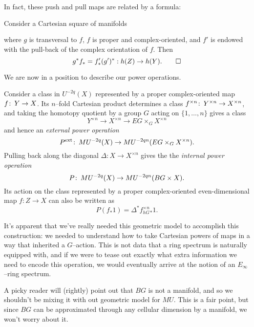 In fact, these push and pull maps are related by a formula:
\begin{lemma}\label{PushPullFormulaForMU}
Consider a Cartesian square of manifolds
\begin{center}
\end{center}
where $g$ is transversal to $f$, $f$ is proper and complex-oriented, and $f'$ is endowed with the pull-back of the complex orientation of $f$. Then \[g^* f_* = f'_* (g')^*: h(Z) \to h(Y). \qed\]
\end{lemma}


We are now in a position to describe our power operations.
\begin{definition}\label{DefnPowerOperationForMU}
Consider a class in $U^{-2q}(X)$ represented by a proper complex-oriented map $f \colon\thinspace Y \to X$.  Its $n$--fold Cartesian product determines a class $f^{\times n} \colon\thinspace Y^{\times n} \to X^{\times n}$, and taking the homotopy quotient by a group $G$ acting on $\{1, \ldots, n\}$ gives a class \[Y^{\times n} \to X^{\times n} \to EG \times_G X^{\times n}\] and hence an \textit{external power operation} \[P^{\mathrm{ext}} \colon\thinspace MU^{-2q}(X) \to MU^{-2qn}(EG \times_G X^{\times n}).\]  Pulling back along the diagonal $\Delta: X \to X^{\times n}$ gives the the \textit{internal power operation} \[P \colon\thinspace MU^{-2q}(X) \to MU^{-2qn}(BG \times X).\]  Its action on the class represented by a proper complex-oriented even-dimensional map $f: Z \to X$ can also be written as \[P(f_* 1) = \Delta^* f^{\times n}_{hG}{}_* 1.\]
\end{definition}

\begin{remark}
It's apparent that we've really needed this geometric model to accomplish this construction: we needed to understand how to take Cartesian powers of maps in a way that inherited a $G$--action.  This is not data that a ring spectrum is naturally equipped with, and if we were to tease out exactly what extra information we need to encode this operation, we would eventually arrive at the notion of an $E_\infty$--ring spectrum.
\end{remark}

\begin{remark}
A picky reader will (rightly) point out that $BG$ is not a manifold, and so we shouldn't be mixing it with out geometric model for $MU$.  This is a fair point, but since $BG$ can be approximated through any cellular dimension by a manifold, we won't worry about it.
\end{remark}

